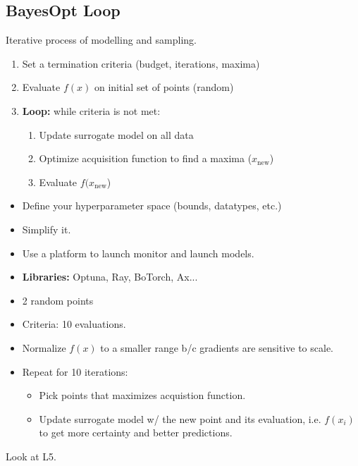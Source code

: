 \subsection{BayesOpt Loop}
\begin{definition}
    Iterative process of modelling and sampling. 
    \begin{enumerate}
        \item Set a termination criteria (budget, iterations, maxima)
        \item Evaluate $f(x)$ on initial set of points (random)
        \item \textbf{Loop:} while criteria is not met:
        \begin{enumerate}
            \item Update surrogate model on all data
            \item Optimize acquisition function to find a maxima ($x_{\text{new}}$)
            \item Evaluate $f(x_{\text{new}}$)
        \end{enumerate}
    \end{enumerate}
\end{definition}

\begin{warning}
    \begin{itemize}
        \item Define your hyperparameter space (bounds, datatypes, etc.)
        \item Simplify it. 
        \item Use a platform to launch monitor and launch models. 
        \item \textbf{Libraries:} Optuna, Ray, BoTorch, Ax...
    \end{itemize}
\end{warning}

\begin{example}
    \begin{itemize}
        \item 2 random points
        \item Criteria: 10 evaluations.
        \item Normalize $f(x)$ to a smaller range b/c gradients are sensitive to scale.
        \item Repeat for 10 iterations:
        \begin{itemize}
            \item Pick points that maximizes acquistion function.
            \item Update surrogate model w/ the new point and its evaluation, i.e. $f(x_i)$ to get more certainty and better predictions.
        \end{itemize}
    \end{itemize}
    \vspace{1em}

    Look at L5.
\end{example}

